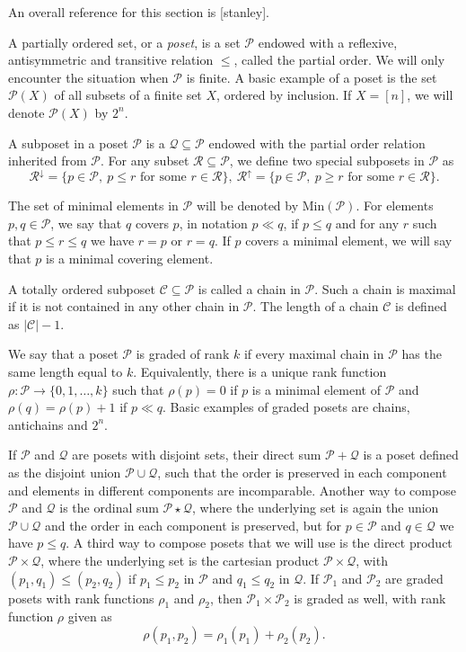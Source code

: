 \documentclass[12pt]{article}
\theoremstyle{definition}
\theoremstyle{remark}
\def\cover{\ll}
\def\Ce{\mathcal C}
\def\Pe{\mathcal P}
\begin{document}
An overall reference for this section is [stanley].


A partially ordered set, or a {\em poset}, is a set $\Pe$ endowed with a reflexive, antisymmetric and
transitive relation $\le$, called the partial order. We will only encounter  the situation
when $\Pe$ is finite. A basic example of a poset is the set $\Pe(X)$ of all subsets of a
finite set $X$, ordered by inclusion. If $X=[n]$, we will denote $\Pe(X)$ by $2^n$. 

A subposet in a poset $\Pe$ is a $\mathcal Q\subseteq \Pe$ endowed with the partial order
relation inherited from $\Pe$. For any subset $\mathcal R\subseteq \Pe$, we define two
special 
subposets in $\Pe$ as
\[
\mathcal R^\downarrow=\{p\in \Pe,\ p\le r \text{ for some } r\in \mathcal R\}, \ \mathcal
R^\uparrow=\{p\in \Pe,\ p\ge  r \text{ for some } r\in \mathcal R\}.
\]

The set of minimal elements in $\Pe$ will be denoted by $\mathrm{Min}(\Pe)$. 
For elements $p,q\in \Pe$, we say that $q$ covers $p$, in notation $p\cover q$,  if $p\le q$
and for any $r$ such that $p\le r\le q$ we have $r=p$ or $r=q$. If $p$ covers a minimal
element, we will say that $p$ is a minimal covering element.


A totally ordered subposet $\Ce\subseteq \Pe$ is called a chain in $\Pe$. Such a chain  is
maximal if it is not contained in any other chain in $\Pe$.
The length of a chain $\Ce$ is defined as $|\Ce|-1$. 

We say that a poset $\Pe$  is graded of rank
$k$ if every maximal chain in $\Pe$ has the same length equal to $k$. Equivalently,  there is
a unique rank function $\rho: \Pe\to \{0,1,\dots,k\}$ such that $\rho(p)=0$ if $p$ is a
minimal element of $\Pe$ and $\rho(q)=\rho(p)+1$ if $p\cover q$. Basic examples of graded
posets are chains, antichains and $2^n$.


If $\Pe$ and $\mathcal Q$ are posets with disjoint sets, their direct sum $\Pe+\mathcal Q$ is a poset defined as 
the disjoint union $\Pe\cup \mathcal Q$, such that the order is preserved in each
component and elements in different components are incomparable. 
 Another way to compose
$\Pe$ and $\mathcal Q$ is the ordinal sum $\Pe\star \mathcal Q$, where the underlying set
is again the union $\Pe\cup \mathcal Q$ and the order in each component is preserved, but
for $p\in \Pe$ and $q\in \mathcal Q$ we have $p\le q$. A third way to compose posets that
we will use is the direct product $\Pe\times \mathcal Q$, where the underlying set is the
cartesian product $\Pe\times \mathcal Q$, with $(p_1,q_1)\le (p_2,q_2)$ if $p_1\le p_2$ in
$\Pe$  and $q_1\le q_2$ in $\mathcal Q$.
If $\Pe_1$ and $\Pe_2$ are graded posets with rank functions $\rho_1$ and $\rho_2$, then 
$\Pe_1\times \Pe_2$ is graded as well, with rank function $\rho$ given as
\[
\rho(p_1,p_2)=\rho_1(p_1)+\rho_2(p_2).
\]
\end{document}
